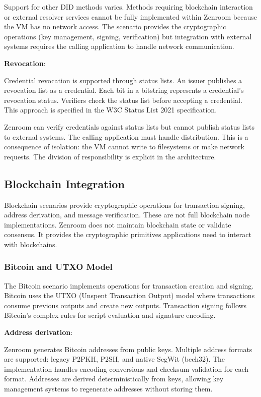 Support for other DID methods varies. Methods requiring blockchain
interaction or external resolver services cannot be fully implemented
within Zenroom because the VM has no network access. The scenario
provides the cryptographic operations (key management, signing,
verification) but integration with external systems requires the
calling application to handle network communication.

\textbf{Revocation}:

Credential revocation is supported through status lists. An issuer
publishes a revocation list as a credential. Each bit in a bitstring
represents a credential's revocation status. Verifiers check the
status list before accepting a credential. This approach is specified
in the W3C Status List 2021 specification.

Zenroom can verify credentials against status lists but cannot publish
status lists to external systems. The calling application must handle
distribution. This is a consequence of isolation: the VM cannot write
to filesystems or make network requests. The division of
responsibility is explicit in the architecture.

\subsection{Blockchain Integration}

Blockchain scenarios provide cryptographic operations for transaction
signing, address derivation, and message verification. These are not
full blockchain node implementations. Zenroom does not maintain
blockchain state or validate consensus. It provides the cryptographic
primitives applications need to interact with blockchains.

\subsubsection{Bitcoin and UTXO Model}

The Bitcoin scenario implements operations for transaction creation
and signing. Bitcoin uses the UTXO (Unspent Transaction Output) model
where transactions consume previous outputs and create new
outputs. Transaction signing follows Bitcoin's complex rules for
script evaluation and signature encoding.

\textbf{Address derivation}:

Zenroom generates Bitcoin addresses from public keys. Multiple address
formats are supported: legacy P2PKH, P2SH, and native SegWit
(bech32). The implementation handles encoding conversions and checksum
validation for each format. Addresses are derived deterministically
from keys, allowing key management systems to regenerate addresses
without storing them.

